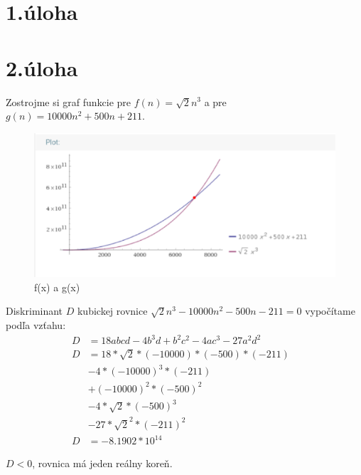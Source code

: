 \documentclass[11pt,a4paper]{article}
\begin{document}
\setlength{\parskip}{0pt}
    \hypersetup{hidelinks}\tableofcontents
\setlength{\parskip}{0pt}

\newpage



\section{1.úloha}
\newpage

\section{2.úloha}
Zostrojme si graf funkcie pre $ f(n) = \sqrt{2} n^3$ a pre $ g(n) = 10000n^2 + 500n + 211 $. \\

\begin{figure}[H]
    \centering
	\includegraphics[width=\textwidth]{2plot.eps}
    \caption{f(x) a g(x)}
    \label{2plot}
\end{figure}


Diskriminant $D$ kubickej rovnice $ \sqrt{2}n^3 -10000n^2 -500n -211 = 0$ vypočítame podľa vzťahu: 
\begin{align*}
    D & = 18abcd -4b^3d + b^2c^2 - 4ac^3 - 27a^2d^2 \\
    D & = 18*\sqrt{2}*(-10000)*(-500)*(-211) & \\
      & -4*(-10000)^3*(-211) & \\
      & +(-10000)^2*(-500)^2 & \\ 
      & -4*\sqrt{2}*(-500)^3 & \\
      & -27*\sqrt{2}^2*(-211)^2 \\
    D &= -8.1902*10^{14}
\end{align*}

$D < 0$, rovnica má jeden reálny koreň.
\end{document}

